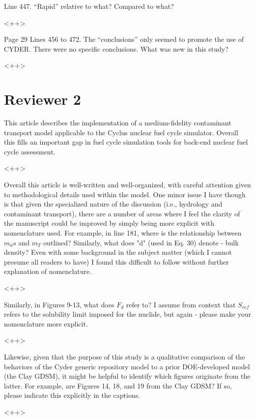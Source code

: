 \documentclass[answers,12pt]{exam}
\begin{document}
\begin{questions}
 

\question Line 447. “Rapid” relative to what? Compared to what?
\begin{solution}
<++>
\end{solution}

 

\question Page 29 Lines 456 to 472. The “conclusions” only seemed to promote the use of CYDER. There were no specific conclusions. What was new in this study? 
\begin{solution}
<++>
\end{solution}


\section*{Reviewer 2}



\question This article describes the implementation of a medium-fidelity contaminant transport model applicable to the Cyclus nuclear fuel cycle simulator. Overall this fills an important gap in fuel cycle simulation tools for back-end nuclear fuel cycle assessment.
\begin{solution}
<++>
\end{solution}

\question Overall this article is well-written and well-organized, with careful attention given to methodological details used within the model. One minor issue I have though is that given the specialized nature of the discussion (i.e., hydrology and contaminant transport), there are a number of areas where I feel the clarity of the manuscript could be improved by simply being more explicit with nomenclature used. For example, in line 181, where is the relationship between $m_ds$ and $m_T$ outlined? Similarly, what does "d" (used in Eq. 30) denote - bulk density? Even with some background in the subject matter (which I cannot presume all readers to have) I found this difficult to follow without further explanation of nomenclature.
\begin{solution}
<++>
\end{solution}

\question Similarly, in Figures 9-13, what does $F_d$ refer to? I assume from 
context that $S_{ref}$ refers to the solubility limit imposed for the nuclide, but again - please make your nomenclature more explicit. 
\begin{solution}
<++>
\end{solution}

\question Likewise, given that the purpose of this study is a qualitative comparison of the behaviors of the Cyder generic repository model to a prior DOE-developed model (the Clay GDSM), it might be helpful to identify which figures originate from the latter. For example, are Figures 14, 18, and 19 from the Clay GDSM? If so, please indicate this explicitly in the captions. 
\begin{solution}
<++>
\end{solution}


\end{questions}
\end{document}
